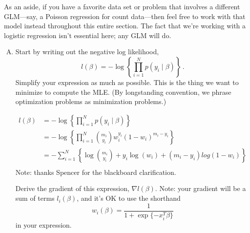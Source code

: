 \documentclass{article}
\begin{document}
As an aside, if you have a favorite data set or problem that involves a different GLM---say, a Poisson regression for count data---then feel free to work with that model instead throughout this entire section.  The fact that we're working with a logistic regression isn't essential here; any GLM will do.

\begin{enumerate}[(A)]
\item Start by writing out the negative log likelihood,
$$
l(\beta) = - \log \left \{ \prod_{i=1}^N p(y_i \mid \beta) \right \} \, .
$$
Simplify your expression as much as possible. This is the thing we want to minimize to compute the MLE.  (By longstanding convention, we phrase optimization problems as minimization problems.)

\color{blue}
\begin{align*}
l(\beta) &= - \log \left \{ \prod_{i=1}^N p(y_i \mid \beta) \right \} \\
&= - \log \left \{ \prod_{i=1}^N \binom{m_i}{y_i} w_i^{y_i} (1-w_i)^{m_i-y_i} \right \} \\
&= -  \sum_{i=1}^N  \left \{ \log\binom{m_i}{y_i} + y_i\log(w_i) + (m_i-y_i)log(1-w_i) \right \} \\
\end{align*}
Note: thanks Spencer for the blackboard clarification. 
\color{black}

Derive the gradient of this expression, $\nabla l(\beta)$.   Note: your gradient will be a sum of terms $l_i(\beta)$, and it's OK to use the shorthand
$$
w_i(\beta) =  \frac{1}{1 + \exp\{-x_i^T \beta\}}
$$
in your expression.


\end{enumerate}
\end{document}
